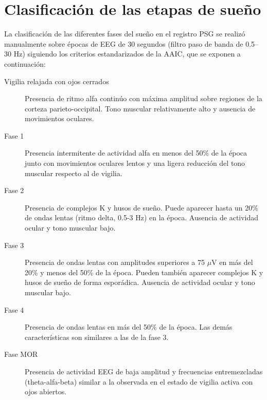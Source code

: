 

\section{Clasificaci\'on de las etapas de sue\~no}

La clasificaci\'on de las diferentes fases del sue\~no en el registro PSG se realiz\'o manualmente 
sobre \'epocas de EEG de 30 segundos (filtro paso de banda de 0.5--30 Hz) siguiendo los criterios 
estandarizados de la AAIC\cite{Hori01}, que se exponen a continuación:
\begin{description}
\item[Vigilia relajada con ojos cerrados] Presencia de ritmo alfa contin\'uo con m\'axima amplitud 
sobre regiones de la corteza parieto-occipital. Tono muscular relativamente alto y ausencia de 
movimientos oculares.

\item[Fase 1] %
Presencia intermitente de 
actividad alfa en menos del 50\% de la \'epoca junto con movimientos oculares lentos y una ligera 
reducci\'on del tono muscular respecto al de vigilia.

\item[Fase 2] Presencia de complejos K y husos de sue\~no. Puede aparecer hasta un 20\% de ondas 
lentas (ritmo delta, 0.5-3 Hz) en la \'epoca. Ausencia de actividad ocular y tono muscular bajo.

\item[Fase 3] Presencia de ondas lentas con amplitudes superiores a 75 $\mu$V en m\'as del
20\% y menos del 50\% de la \'epoca. Pueden tambi\'en aparecer complejos K y husos de sue\~no de 
forma espor\'adica. Ausencia de actividad ocular y tono muscular bajo.

\item[Fase 4] Presencia de ondas lentas en m\'as del 50\% de la época. Las dem\'as 
caracter\'isticas son similares a las de la fase 3.

\item[Fase MOR] Presencia de actividad EEG de baja amplitud y frecuencias entremezcladas 
(theta-alfa-beta) similar a la observada en el estado de vigilia activa con ojos abiertos.
\end{description}

